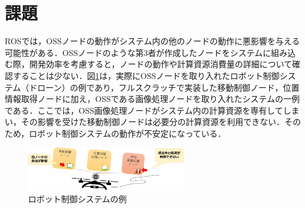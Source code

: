 \documentclass[11pt]{ujarticle} %
\begin{document}
\section{課題}
ROSでは，OSSノードの動作がシステム内の他のノードの動作に悪影響を与える可能性がある．OSSノードのような第3者が作成したノードをシステムに組み込む際，開発効率を考慮すると，ノードの動作や計算資源消費量の詳細について確認することは少ない．図\ref{fig:before}は，実際にOSSノードを取り入れたロボット制御システム（ドローン）の例であり，フルスクラッチで実装した移動制御ノード，位置情報取得ノードに加え，OSSである画像処理ノードを取り入れたシステムの一例である．ここでは，OSS画像処理ノードがシステム内の計算資源を専有してしまい，その影響を受けた移動制御ノードは必要分の計算資源を利用できない．そのため，ロボット制御システムの動作が不安定になっている．

\begin{figure}[h]
   \centering
   \includegraphics[width=7cm]{img/before.pdf}
   \caption{ロボット制御システムの例}
   \label{fig:before}
\end{figure}
\end{document}
